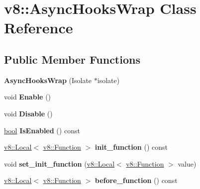 \hypertarget{classv8_1_1AsyncHooksWrap}{}\section{v8\+:\+:Async\+Hooks\+Wrap Class Reference}
\label{classv8_1_1AsyncHooksWrap}
\subsection*{Public Member Functions}
\begin{DoxyCompactItemize}
\item 
\mbox{\label{classv8_1_1AsyncHooksWrap_aa126a6e7d0040eed5b688c2719b01ec7}} 
{\bfseries Async\+Hooks\+Wrap} (Isolate $\ast$isolate)
\item 
\mbox{\label{classv8_1_1AsyncHooksWrap_aa30294f391a701af21bdc3747787a5fc}} 
void {\bfseries Enable} ()
\item 
\mbox{\label{classv8_1_1AsyncHooksWrap_a42dfa2b3bd92f6d0f8fd05d69d24a1d8}} 
void {\bfseries Disable} ()
\item 
\mbox{\label{classv8_1_1AsyncHooksWrap_aa58fd11946cb3e15378ce28beb1f228e}} 
\mbox{\hyperlink{classbool}{bool}} {\bfseries Is\+Enabled} () const
\item 
\mbox{\label{classv8_1_1AsyncHooksWrap_aa6c59032c93838e02b548d0f4eb88a0a}} 
\mbox{\hyperlink{classv8_1_1Local}{v8\+::\+Local}}$<$ \mbox{\hyperlink{classv8_1_1Function}{v8\+::\+Function}} $>$ {\bfseries init\+\_\+function} () const
\item 
\mbox{\label{classv8_1_1AsyncHooksWrap_a93cfce0a5b47b3c69cd6aa2e420bc762}} 
void {\bfseries set\+\_\+init\+\_\+function} (\mbox{\hyperlink{classv8_1_1Local}{v8\+::\+Local}}$<$ \mbox{\hyperlink{classv8_1_1Function}{v8\+::\+Function}} $>$ value)
\item 
\mbox{\label{classv8_1_1AsyncHooksWrap_a87dfece0b5f99b9aa258ab3064753b77}} 
\mbox{\hyperlink{classv8_1_1Local}{v8\+::\+Local}}$<$ \mbox{\hyperlink{classv8_1_1Function}{v8\+::\+Function}} $>$ {\bfseries before\+\_\+function} () const

\end{DoxyCompactItemize}

